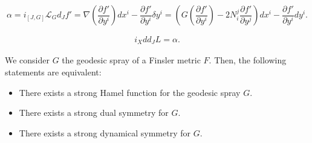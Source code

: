 \documentclass[10pt,a4paper]{amsart}
\begin{document}
\begin{equation}\label{alpha}
\alpha = i_{[J,G]}\mathcal{L}_Gd_Jf' = \nabla\left(\dfrac{\partial f'}{\partial y^i}\right)dx^i-\dfrac{\partial f'}{\partial y^i}\delta y^i = \left(G\left(\dfrac{\partial f'}{\partial y^i}\right) - 2N^j_i\dfrac{\partial f'}{\partial y^j}\right)dx^i-\dfrac{\partial f'}{\partial y^i} d y^i.
\end{equation} 

\begin{eqnarray}
i_Xdd_JL=\alpha. \label{ixalpha}
\end{eqnarray}

\begin{theorem}\label{thm:SHF}
We consider $G$ the geodesic spray of a Finsler metric $F$. Then, the following statements are equivalent:
\begin{itemize}
\item[i)] There exists a strong Hamel function for the geodesic spray $G$.
\item[ii)] There exists a strong dual symmetry for $G$.
\item[iii)] There exists a strong dynamical symmetry for $G$.
\end{itemize}
\end{theorem}
\end{document}
